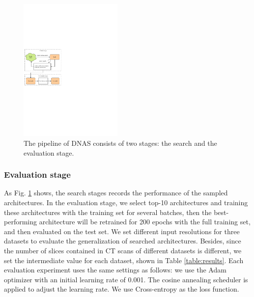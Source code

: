 \documentclass[letterpaper]{article}
\begin{document}
\begin{figure}[!ht]
    \centering
    \includegraphics[width=0.45\textwidth]{images/gdas.pdf}
    \caption{The pipeline of DNAS consists of two stages: the search and the evaluation stage.}
    \label{fig:gdas}
\end{figure}

  
\subsubsection{Evaluation stage}

As Fig. \ref{fig:gdas} shows, the search stages records the performance of the sampled architectures. In the evaluation stage, we select top-10 architectures and training these architectures with the training set for several batches, then the best-performing architecture will be retrained for 200 epochs with the full training set, and then evaluated on the test set. We set different input resolutions for three datasets to evaluate the generalization of searched architectures. Besides, since the number of slices contained in CT scans of different datasets is different, we set the intermediate value for each dataset, shown in Table \ref{table:results}. Each evaluation experiment uses the same settings as follows: we use the Adam \cite{adam} optimizer with an initial learning rate of 0.001. The cosine annealing scheduler \cite{cosineannealinglr} is applied to adjust the learning rate. We use Cross-entropy as the loss function.
\end{document}
